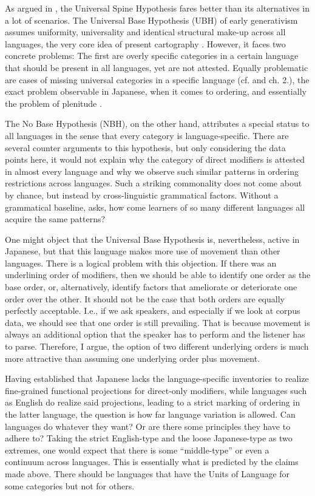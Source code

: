 \documentclass [output=book,colorlinks,citecolor=brown]{langscibook}
\begin{document}
As argued in \citet{wiltschko:2014:universal}, the Universal Spine Hypothesis fares better than its alternatives in a lot of scenarios. The Universal Base Hypothesis (UBH) of early generativism \citep{chomsky:1965:aspects} assumes uniformity, universality and identical structural make-up across all languages, the very core idea of present cartography \citep[68]{cinriz:2010:carto}. However, it faces two concrete problems: The first are overly specific categories in a certain language that should be present in all languages, yet are not attested. Equally problematic are cases of missing universal categories in a specific language (cf. \citealt[10–19]{wiltschko:2014:universal} and ch. 2.), the exact problem observable in Japanese, when it comes to ordering, and essentially the problem of plenitude \citep{larson:2021:rethinking}.

The No Base Hypothesis (NBH), on the other hand, attributes a special status to all languages in the sense that every category is language-specific. There are several counter arguments to this hypothesis, but only considering the data points here, it would not explain why the category of direct modifiers is attested in almost every language and why we observe such similar patterns in ordering restrictions across languages. Such a striking commonality does not come about by chance, but instead by cross-linguistic grammatical factors. Without a grammatical baseline, \citet[19–23]{wiltschko:2014:universal} asks, how come learners of so many different languages all acquire the same patterns?

One might object that the Universal Base Hypothesis is, nevertheless, active in Japanese, but that this language makes more use of movement than other languages. There is a logical problem with this objection. If there was an underlining order of modifiers, then we should be able to identify one order as the base order, or, alternatively, identify factors that ameliorate or deteriorate one order over the other. It should not be the case that both orders are equally perfectly acceptable. I.e., if we ask speakers, and especially if we look at corpus data, we should see that one order is still prevailing. That is because movement is always an additional option that the speaker has to perform and the listener has to parse. Therefore, I argue, the option of two different underlying orders is much more attractive than assuming one underlying order plus movement. %

Having established that Japanese lacks the language-specific inventories to realize fine-grained functional projections for direct-only modifiers, while languages such as English do realize said projections, leading to a strict marking of ordering in the latter language, the question is how far language variation is allowed. Can languages do whatever they want? Or are there some principles they have to adhere to? Taking the strict English-type and the loose Japanese-type as two extremes, one would expect that there is some ``middle-type'' or even a continuum across languages. This is essentially what is predicted by the claims made above. There should be languages that have the Units of Language for some categories but not for others.
\end{document}
